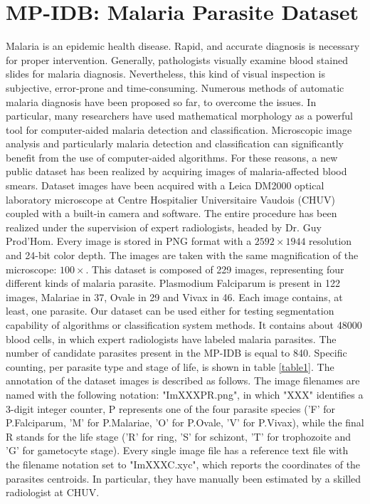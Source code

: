 \documentclass[final,a4paper,12pt,english]{UnicaPhdThesis3}
\begin{document}
{\section{MP-IDB: Malaria Parasite Dataset}
Malaria is an epidemic health disease. Rapid, and accurate diagnosis is necessary for proper intervention. Generally, pathologists visually examine blood stained slides for malaria diagnosis. 
Nevertheless, this kind of visual inspection is subjective, error-prone and time-consuming. Numerous methods of automatic malaria diagnosis have been proposed so far, to overcome the issues. In particular, many researchers have used mathematical morphology as a powerful tool for computer-aided malaria detection and classification.
Microscopic image analysis and particularly malaria detection and classification can significantly benefit from the use of computer-aided algorithms. For these reasons, a new public dataset has been realized by acquiring images of malaria-affected blood smears.
Dataset images have been acquired with a Leica DM2000 optical laboratory microscope at Centre Hospitalier Universitaire Vaudois (CHUV) coupled with a built-in camera and software. The entire procedure has been realized under the supervision of expert radiologists, headed by Dr. Guy Prod'Hom. Every image is stored in PNG format with a $2592\times1944$ resolution and 24-bit color depth. The images are taken with the same magnification of the microscope: $100\times$.
This dataset is composed of 229 images, representing four different kinds of malaria parasite. Plasmodium Falciparum is present in 122 images, Malariae in 37, Ovale in 29 and Vivax in 46. Each image contains, at least, one parasite. Our dataset can be used either for testing segmentation capability of algorithms or classification system methods. 
It contains about 48000 blood cells, in which expert radiologists have labeled malaria parasites. The number of candidate parasites present in the MP-IDB is equal to 840. Specific counting, per parasite type and stage of life, is shown in table \ref{table1}.
The annotation of the dataset images is described as follows. The image filenames are named with the following notation: "ImXXXPR.png", in which "XXX" identifies a 3-digit integer counter, P represents one of the four parasite species ('F' for P.Falciparum, 'M' for P.Malariae, 'O' for P.Ovale, 'V' for P.Vivax), while the final R stands for the life stage ('R' for ring, 'S' for schizont, 'T' for trophozoite and 'G' for gametocyte stage). Every single image file has a reference text file with the filename notation set to "ImXXXC.xyc", which reports the coordinates of the parasites centroids. In particular, they have manually been estimated by a skilled radiologist at CHUV. 
}
\end{document}

